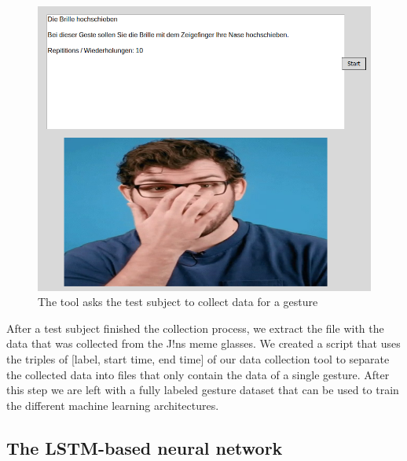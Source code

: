 \documentclass[runningheads]{llncs}
\begin{document}
\begin{figure}
\centering
\centerline{\includegraphics[scale=0.3]{Gesture_Description.png}}
\caption{The tool asks the test subject to collect data for a gesture}
\label{fig:gesturedatacollection}
\end{figure}
After a test subject finished the collection process, we extract the file with the data that was collected from the J!ns meme glasses. We created a script that uses the triples of [label, start time, end time] of our data collection tool to separate the collected data into files that only contain the data of a single gesture. After this step we are left with a fully labeled gesture dataset that can be used to train the different machine learning architectures.

\subsection{The LSTM-based neural network}
\end{document}
